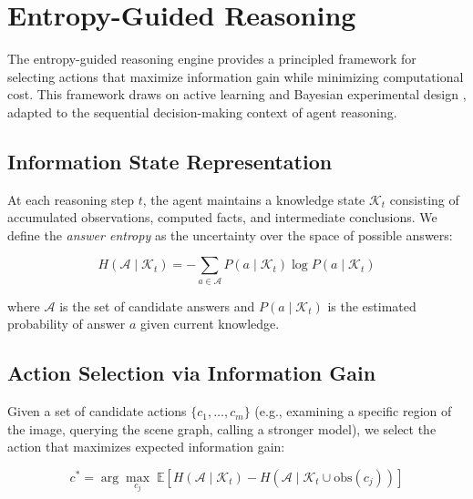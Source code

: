 \documentclass[11pt]{article}
\begin{document}
\section{Entropy-Guided Reasoning}
\label{sec:entropy}

The entropy-guided reasoning engine provides a principled framework for selecting actions that maximize information gain while minimizing computational cost. This framework draws on active learning \citep{settles2009active} and Bayesian experimental design \citep{chaloner1995bayesian}, adapted to the sequential decision-making context of agent reasoning.

\subsection{Information State Representation}

At each reasoning step $t$, the agent maintains a knowledge state $\mathcal{K}_t$ consisting of accumulated observations, computed facts, and intermediate conclusions. We define the \emph{answer entropy} as the uncertainty over the space of possible answers:

\begin{equation}
  H(\mathcal{A} \mid \mathcal{K}_t) = -\sum_{a \in \mathcal{A}} P(a \mid \mathcal{K}_t) \log P(a \mid \mathcal{K}_t)
  \label{eq:entropy}
\end{equation}

where $\mathcal{A}$ is the set of candidate answers and $P(a \mid \mathcal{K}_t)$ is the estimated probability of answer $a$ given current knowledge.

\subsection{Action Selection via Information Gain}

Given a set of candidate actions $\{c_1, \ldots, c_m\}$ (e.g., examining a specific region of the image, querying the scene graph, calling a stronger model), we select the action that maximizes expected information gain:

\begin{equation}
  c^* = \arg\max_{c_j} \; \mathbb{E}\left[ H(\mathcal{A} \mid \mathcal{K}_t) - H(\mathcal{A} \mid \mathcal{K}_t \cup \text{obs}(c_j)) \right]
  \label{eq:ig}
\end{equation}
\end{document}
